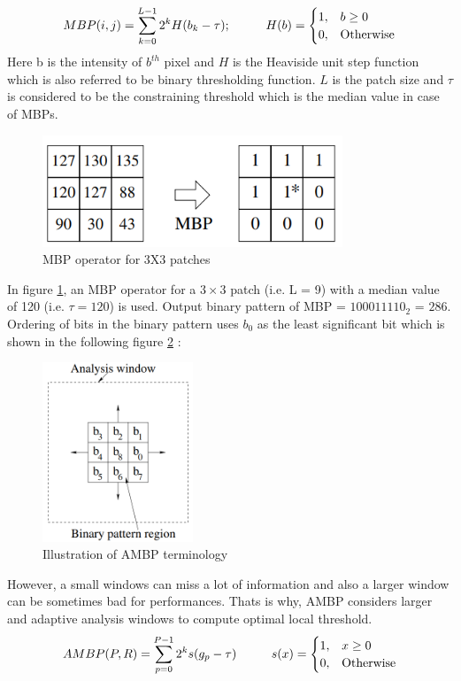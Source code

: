 \documentclass[12pt]{article}
\newcommand\tab[1][1cm]{\hspace*{#1}}
\begin{document}
\begin{equation}
MBP(i,j)=\sum\limits_{k=0}^{L-1}{{{2}^{k}}H(b_k-\tau)}; \tab H(b)=
\begin{cases}
1,&  b\geq 0\\
0,&  \text{Otherwise}
\end{cases}
\label{equation:2.13}
\end{equation} 
Here b is the intensity of $b^{th}$ pixel and $H$ is the Heaviside unit step function which is also referred to be binary thresholding function. $L$ is the patch size and $\tau$ is considered to be the constraining threshold which is the median value in case of MBPs.
\begin{figure}[H]
	\centering
	\includegraphics[width=0.8\textwidth]{mbp}
	\caption{MBP operator for 3X3 patches}
	\label{figure:MBP1}
\end{figure}
In figure \ref{figure:MBP1}, an MBP operator for a $3 \times 3$ patch (i.e. L = 9) with a median value
of 120 (i.e. $\tau = 120$) is used. Output binary pattern of  MBP = ${100011110}_2$ = $286$.
Ordering of bits in the binary pattern uses $b_0$ as the least significant bit which is shown in the following figure \ref{figure:following} :

\begin{figure}[H]
	\centering
	\includegraphics[width=0.4\textwidth]{ambp_ref}
	\caption{Illustration of AMBP terminology}
	\label{figure:following}
\end{figure}
However, a small windows can miss a lot of information and also a larger window can be sometimes bad for performances. Thats is why, AMBP considers larger and adaptive analysis windows to compute optimal local threshold.\\
\begin{equation}
AMBP(P,R)=\sum\limits_{p=0}^{P-1}{{{2}^{k}}s(g_p-\tau)} \tab  s(x)= 
\begin{cases}
1,&  x\geq 0\\
0,&  \text{Otherwise}
\end{cases}
\label{equation:2.15}
\end{equation}
\end{document}
